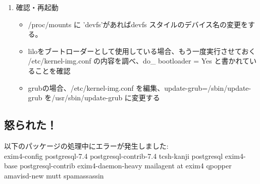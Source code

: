 \documentclass[mingoth,a4paper]{jsarticle}
\begin{document}
\begin{enumerate}
\item 確認・再起動
\begin{itemize}
\item /proc/mounts に 'devfs'があればdevfs スタイルのデバイス名の変更をする。
\item liloをブートローダーとして使用している場合、もう一度実行させておく \\
 {/}etc/kernel-img.conf の内容を調べ、do\_{ }bootloader = Yes と書かれていることを確認
\item grubの場合、/etc/kernel-img.conf を編集、update-grub=/sbin/update-grub を/usr/sbin/update-grub に変更する
\end{itemize}
\end{enumerate}

\subsection{怒られた！}
以下のパッケージの処理中にエラーが発生しました: \\
exim4-config postgresql-7.4 postgresql-contrib-7.4 tcsh-kanji postgresql exim4-base postgresql-contrib exim4-daemon-heavy mailagent at exim4 qpopper amavisd-new mutt spamassassin 
\end{document}
